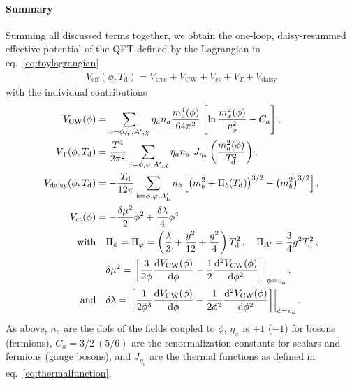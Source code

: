 \paragraph{Summary} Summing all discussed terms together, we obtain the one-loop, daisy-resummed effective potential of the \ac{QFT} defined by the Lagrangian in eq.~\eqref{eq:toylagrangian}~\cite{Baker:2017zwx}
\begin{align}
	V_\text{eff}(\phi, T_\text{d}) = V_\text{tree} + V_\text{CW} + V_\text{ct} + V_T + V_\text{daisy}
	\label{eq:Veff}
\end{align}
with the individual contributions
	\begin{align}
		V_\text{CW}(\phi) &= \sum_{a = \phi, \varphi, A^\prime, \chi} \eta_a  n_a \frac{m_a^4(\phi)}{64 \pi^2} \left[ \ln \frac{m_x^2(\phi)}{v_\phi^2} - C_a \right] , \nonumber\\
		V_\text{T}(\phi, T_\text{d}) &= \frac{T^4}{2 \pi^2} \sum_{a = \phi, \varphi, A^\prime, \chi}  \eta_a n_a\ J_{\eta_a} \left( \frac{m_a^2(\phi)}{T^2_\text{d}} \right) , \nonumber\\
		V_\text{daisy}(\phi, T_\text{d}) &= - \frac{T_\text{d}}{12 \pi} \sum_{b = \phi, \varphi, A_\text{L}^\prime} n_b \left[ \left( m^2_b + \Pi_b(T_\text{d}) \right)^{3/2} - \left( m^2_b \right)^{3/2} \right]  \nonumber , \\
		V_\text{ct}(\phi) &= - \frac{\delta \mu^2}{2} \phi^2 + \frac{\delta \lambda}{4} \phi^4 \nonumber \\
		\text{with} & \quad \Pi_{\phi} = \Pi_{\varphi} = \left(\frac{\lambda}{3} + \frac{y^2}{12} + \frac{g^2}{4}\right)T^2_\text{d} \, , \quad 
		\Pi_{A'} = \frac{3}{4} g^2 T^2_\text{d} \, , \nonumber \\
		 &\quad  \delta \mu^2 = \left. \left[ \frac{3}{2 \phi} \frac{\mathrm d V_\text{CW}(\phi)}{\mathrm d \phi} - \frac{1}{2} \frac{\mathrm d^2 V_\text{CW}(\phi)}{\mathrm d \phi^2} \right]\right|_{\phi = v_\phi}  , \nonumber \\
		\text{and}&\quad  \delta \lambda = \left. \left[ \frac{1}{2 \phi^3} \frac{\mathrm d V_\text{CW}(\phi)}{\mathrm d \phi} - \frac{1}{2 \phi^2} \frac{\mathrm d^2 V_\text{CW}(\phi)}{\mathrm d \phi^2} \right]\right|_{\phi = v_\phi} . 
	\end{align}
As above, $n_a$ are the \acp{dof} of the fields coupled to $\phi$, $\eta_x$ is $+1$ ($-1$) for bosons (fermions), $C_a = 3/2 \ (5/6)$ are the renormalization constants for scalars and fermions (gauge bosons), and $J_{\eta_a}$ are the thermal functions as defined in eq.~\eqref{eq:thermalfunction}.

